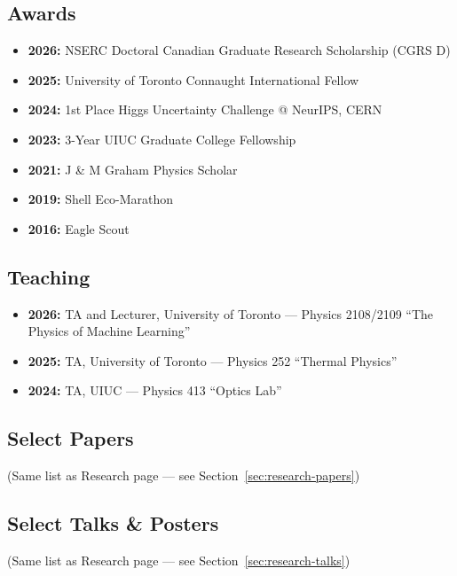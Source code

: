 \documentclass[11pt]{article}
\begin{document}
\subsection{Awards}
\label{sec:about-awards}

\begin{itemize}
    \item \textbf{2026:} NSERC Doctoral Canadian Graduate Research Scholarship (CGRS D)
    \item \textbf{2025:} University of Toronto Connaught International Fellow
    \item \textbf{2024:} 1st Place Higgs Uncertainty Challenge @ NeurIPS, CERN
    \item \textbf{2023:} 3-Year UIUC Graduate College Fellowship
    \item \textbf{2021:} J \& M Graham Physics Scholar
    \item \textbf{2019:} Shell Eco-Marathon
    \item \textbf{2016:} Eagle Scout
\end{itemize}

\subsection{Teaching}
\label{sec:about-teaching}

\begin{itemize}
    \item \textbf{2026:} TA and Lecturer, University of Toronto --- Physics 2108/2109 ``The Physics of Machine Learning''
    \item \textbf{2025:} TA, University of Toronto --- Physics 252 ``Thermal Physics''
    \item \textbf{2024:} TA, UIUC --- Physics 413 ``Optics Lab''
\end{itemize}

\subsection{Select Papers}
\label{sec:about-papers}
(Same list as Research page --- see Section~\ref{sec:research-papers})

\subsection{Select Talks \& Posters}
\label{sec:about-talks}
(Same list as Research page --- see Section~\ref{sec:research-talks})
\end{document}
